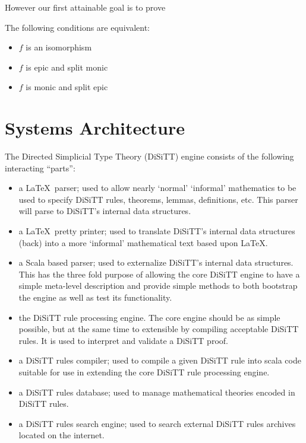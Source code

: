 \documentclass[a4paper,openany]{amsbook}
\begin{document}
However our first attainable goal is to prove

\begin{theorem}
The following conditions are equivalent:
\begin{itemize}
  \item $f$ is an isomorphism
  \item $f$ is epic and split monic
  \item $f$ is monic and split epic
\end{itemize}
\end{theorem}



\chapter{Systems Architecture}

The Directed Simplicial Type Theory (DiSiTT) engine consists of the following
interacting ``parts'':
\begin{itemize}
  \item a \LaTeX\ parser; used to allow nearly `normal' `informal' mathematics
  to be used to specify DiSiTT rules, theorems, lemmas, definitions, etc. This
  parser will parse to DiSiTT's internal data structures.
  \item a \LaTeX\ pretty printer; used to translate DiSiTT's internal data
  structures (back) into a more `informal' mathematical text based upon
  \LaTeX.
  \item a Scala based parser; used to externalize DiSiTT's internal data
  structures. This has the three fold purpose of allowing the core DiSiTT
  engine to have a simple meta-level description and provide simple methods to
  both bootstrap the engine as well as test its functionality.
  \item the DiSiTT rule processing engine. The core engine should be as simple
  possible, but at the same time to extensible by compiling acceptable DiSiTT
  rules. It is used to interpret and validate a DiSiTT proof.
  \item a DiSiTT rules compiler; used to compile a given DiSiTT rule into
  scala code suitable for use in extending the core DiSiTT rule processing
  engine.
  \item a DiSiTT rules database; used to manage mathematical theories encoded
  in DiSiTT rules.
  \item a DiSiTT rules search engine; used to search external DiSiTT rules
  archives located on the internet.
\end{itemize}
%
\end{document}
